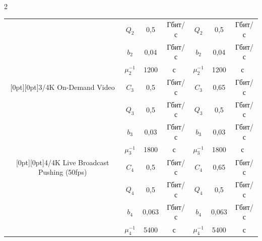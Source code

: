 \begin{multicols}{2}
\begin{table}
\begin{center}
\begin{tabular}{|c|c|c|c|c|c|c|}
\\


                                 & $Q_2$ & 0,5 & Гбит/с & $Q_2$ & 0,5  & Гбит/с 


\\


                                 & $b_2$ & 0,04 & Гбит/с & $b_2$ & 0,04  &  Гбит/с \\


                                 & $\mu_2^{-1}$ & 1200 & с~& $\mu_2^{-1}$ & 1200  


& с~\\


\hline


\multicolumn{1}{|c|}{\raisebox{-18pt}[0pt][0pt]{3/4K On-Demand Video}} & $C_3$ & 0,5 & Гбит/с & $C_3$ & 0,65 & Гбит/с \\


                       & $Q_3$ & 0,5 & Гбит/с & $Q_3$ & 0,5  & Гбит/с \\


                       & $b_3$ & 0,03 & Гбит/с & $b_3$ & 0,03  & Гбит/с \\


                       & $\mu_3^{-1}$ & 1800 & с~& $\mu_3^{-1}$ & 1800  & с~\\


\hline


\multicolumn{1}{|c|}{\raisebox{-18pt}[0pt][0pt]{4/4K Live Broadcast Pushing (50fps)}} & $C_4$ & 0,5 & Гбит/с & $C_4$ & 0,65 & Гбит/с \\


                                      & $Q_4$ & 0,5 & Гбит/с & $Q_4$ & 0,5  & 


Гбит/с \\


                                      & $b_4$ & 0,063 & Гбит/с & $b_4$ & 0,063  


& Гбит/с \\


                                      & $\mu_4^{-1}$ & 5400 & с~& $\mu_4^{-1}$ & 


5400  & с\\


\hline


\end{tabular}


\end{center}


\vspace*{5pt}






\end{table}
\end{multicols}
